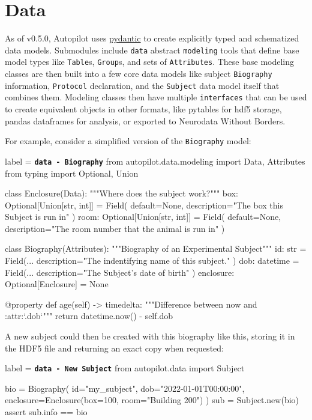 \section{Data}
\label{sec:datamodel}

As of v0.5.0, Autopilot uses \href{https://pydantic-docs.helpmanual.io/}{pydantic} to create explicitly typed and schematized data models. Submodules include \texttt{data} abstract \texttt{modeling} tools that define base model types like \texttt{Table}s, \texttt{Group}s, and sets of \texttt{Attributes}. These base modeling classes are then built into a few core data models like subject \texttt{Biography} information, \texttt{Protocol} declaration, and the \texttt{Subject} data model itself that combines them. Modeling classes then have multiple \texttt{interfaces} that can be used to create equivalent objects in other formats, like pytables for hdf5 storage, pandas dataframes for analysis, or exported to Neurodata Without Borders.

For example, consider a simplified version of the \texttt{Biography} model:


\begin{pythoncode*}{label = \texttt{\textbf{data - Biography}}}
from autopilot.data.modeling import Data, Attributes
from typing import Optional, Union

class Enclosure(Data):
    """Where does the subject work?"""
    box:  Optional[Union[str, int]] = Field(
        default=None, 
        description="The box this Subject is run in"
    )
    room: Optional[Union[str, int]] = Field(
        default=None, 
        description="The room number that the animal is run in"
    )

class Biography(Attributes):
    """Biography of an Experimental Subject"""
    id:  str = Field(...
        description="The indentifying name of this subject."
    )
    dob: datetime = Field(... 
        description="The Subject's date of birth"
    )
    enclosure: Optional[Enclosure] = None

    @property
    def age(self) -> timedelta:
        """Difference between now and :attr:`.dob`"""
        return datetime.now() - self.dob
\end{pythoncode*}

A new subject could then be created with this biography like this, storing it in the HDF5 file and returning an exact copy when requested:

\begin{pythoncode*}{label = \texttt{\textbf{data - New Subject}}}
from autopilot.data import Subject

bio = Biography(
    id="my_subject",
    dob="2022-01-01T00:00:00",
    enclosure=Enclosure(box=100, room="Building 200")
)
sub = Subject.new(bio)
assert sub.info == bio
\end{pythoncode*}

